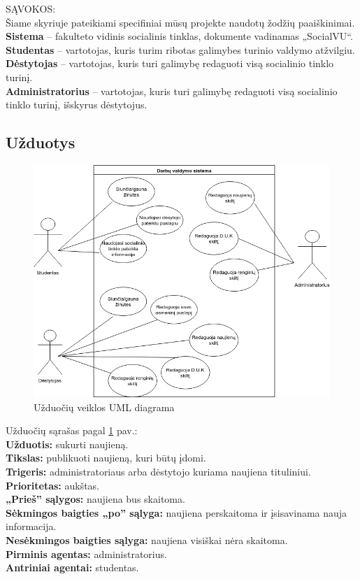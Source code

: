 \documentclass{VUMIFPSkursinis}
\begin{document}
SĄVOKOS: \\
Šiame skyriuje pateikiami specifiniai mūsų projekte naudotų žodžių paaiškinimai. \\
\textbf{Sistema} – fakulteto vidinis socialinis tinklas, dokumente vadinamas „SocialVU“. \\
\textbf{Studentas} – vartotojas, kuris turim ribotas galimybes turinio valdymo atžvilgiu.\\
\textbf{Dėstytojas} – vartotojas, kuris turi galimybę redaguoti visą socialinio tinklo turinį.\\
\textbf{Administratorius} – vartotojas, kuris turi galimybę redaguoti visą socialinio tinklo turinį, išskyrus dėstytojus.

\subsection{Užduotys}
\begin{figure}[H]
\centering
\includegraphics[width=\linewidth]{img/DVS.png}
\caption{Užduočių veiklos UML diagrama}
\label{fig:dvs}
\end{figure}
\setlength{\parindent}{0pt}Užduočių sąrašas pagal \ref{fig:dvs} pav.:\\
\setlength{\parindent}{0pt}\textbf{Užduotis:} sukurti naujieną. \\
\textbf{Tikslas:} publikuoti naujieną, kuri būtų įdomi.\\
\textbf{Trigeris:} administratoriaus arba dėstytojo kuriama naujiena tituliniui. \\
\textbf{Prioritetas:} aukštas. \\
\textbf{„Prieš” sąlygos:} naujiena bus skaitoma.\\
\textbf{Sėkmingos baigties „po” sąlyga:} naujiena perskaitoma ir įsisavinama nauja informacija. \\
\textbf{Nesėkmingos baigties sąlyga:} naujiena visiškai nėra skaitoma. \\
\textbf{Pirminis agentas:} administratorius. \\
\textbf{Antriniai agentai:} studentas. \\
\end{document}
